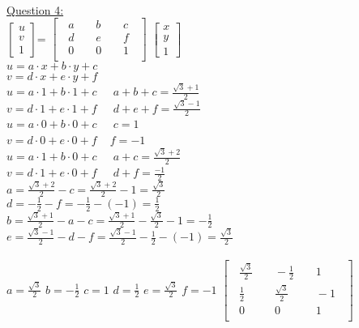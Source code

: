 \documentclass[12pt]{article}\usepackage{amsmath}
\begin{document}
\pagebreak\\
\underline{Question 4:}\\
$\begin{bmatrix}
u\\
v\\
1
\end{bmatrix}$=
$\begin{bmatrix}
\;\; a \;\; & \;\; b \;\; & \;\; c \;\;\\
\;\; d \;\; & \;\; e \;\; & \;\; f \;\;\\
\;\; 0 \;\; & \;\; 0 \;\; & \;\; 1 \;\;\\
\end{bmatrix}$
$\begin{bmatrix}
x\\
y\\
1
\end{bmatrix}$\\
$u = a\cdot x + b\cdot y + c$\\
$v = d\cdot x + e\cdot y + f$\\
$u = a\cdot 1 + b\cdot 1 + c \;\; $ $\;\;
a+b+c = \frac{\sqrt{3}+1}{2}$ \\
$v = d\cdot 1 + e\cdot 1 + f\;\;$ $\;\;
d+e+f = \frac{\sqrt{3}-1}{2}$ \\
$u = a\cdot 0 + b\cdot 0 + c\;\;$ $\;\;
c = 1$\\
$v = d\cdot 0 + e\cdot 0 + f\;$ $\;\;
f = -1$\\
$u = a\cdot 1 + b\cdot 0 + c\;\;$ $\;\;
a+c = \frac{\sqrt{3}+2}{2}
$\\
$v = d\cdot 1 + e\cdot 0 + f\;\;$ $\;\;
d + f = \frac{-1}{2}
$\\
$a = \frac{\sqrt{3}+2}{2} - c = \frac{\sqrt{3}+2}{2} - 1 = \frac{\sqrt{3}}{2}$\\
$d = -\frac{1}{2} - f = -\frac{1}{2} - (-1) = \frac{1}{2}$\\
$b = \frac{\sqrt{3}+1}{2} - a - c = 
\frac{\sqrt{3}+1}{2} - \frac{\sqrt{3}}{2} - 1 =
-\frac{1}{2} 
$ \\
$e = \frac{\sqrt{3}-1}{2} -d -f =
\frac{\sqrt{3}-1}{2} -\frac{1}{2} -(-1) =
\frac{\sqrt{3}}{2}
$ \\\\
$a = \frac{\sqrt{3}}{2}$
$b = -\frac{1}{2} $ 
$c = 1$
$d = \frac{1}{2}$
$e = \frac{\sqrt{3}}{2}$ 
$f = -1$
$\begin{bmatrix}
\;\; \frac{\sqrt{3}}{2} \;\; & \;\;-\frac{1}{2}\;\; & \;\; 1 \;\;\\
\;\; \frac{1}{2} \;\; & \;\; \frac{\sqrt{3}}{2} \;\; & \;\; -1 \;\;\\
\;\; 0 \;\; & \;\; 0 \;\; & \;\; 1 \;\;\\
\end{bmatrix}$
\end{document}
